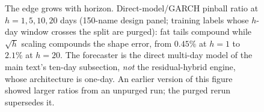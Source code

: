 \documentclass[11pt]{article}
\begin{document}
\clearpage
\begin{figure}[htbp]
\centering
{}
\caption{The edge grows with horizon. Direct-model/GARCH pinball
ratio at $h = 1, 5, 10, 20$ days (150-name design panel; training
labels whose $h$-day window crosses the split are purged): fat tails
compound while $\sqrt{h}$ scaling compounds the shape error, from $0.45\%$ at $h{=}1$ to $2.1\%$ at $h{=}20$. The forecaster is the
direct multi-day model of the main text's ten-day subsection,
\emph{not} the residual-hybrid engine, whose architecture is
one-day. An earlier version of this figure showed larger ratios from
an unpurged run; the purged rerun supersedes it.}
\label{fig:horizon}
\end{figure}
\clearpage
\end{document}
